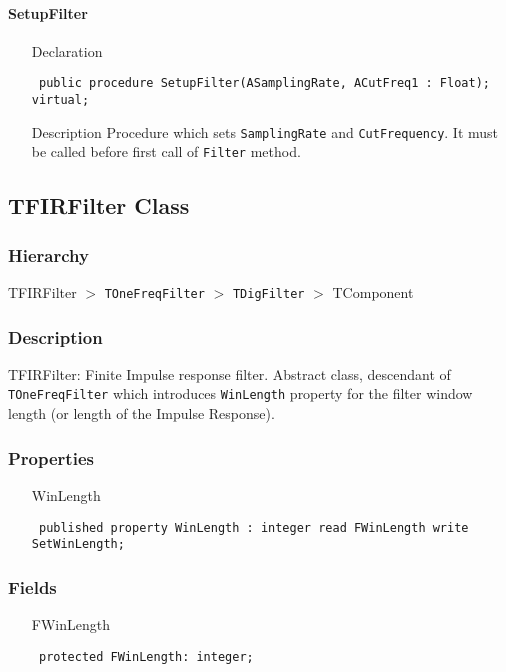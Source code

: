 \documentclass[12pt,a4paper,oneside]{report}
\newcommand{\declarationitem}[1]{{\addfontfeatures{FakeBold=1.3} #1}}
\newcommand{\descriptiontitle}[1]{{\addfontfeatures{FakeSlant}#1}}
\newcommand{\code}[1]{\texttt{#1}}
\begin{document}
\paragraph{SetupFilter}\hspace*{\fill}
\label{lmfilters.TOneFreqFilter-SetupFilter}
\begin{itemize}\item[\declarationitem{Declaration}\hfill]
	\begin{flushleft}
		\code{
			public procedure SetupFilter(ASamplingRate, ACutFreq1 : Float); virtual;}
	\end{flushleft}
	\item[\descriptiontitle{Description}] Procedure which sets \code{SamplingRate} and \code{CutFrequency}. It must be called before first call of \code{Filter} method.	
\end{itemize}
\subsection{TFIRFilter Class}
\label{lmfilters.TFIRFilter}
\subsubsection{Hierarchy}
TFIRFilter {$>$} \code{TOneFreqFilter} {$>$} \code{TDigFilter} {$>$} 
TComponent
\subsubsection{Description}
TFIRFilter: Finite Impulse response filter. Abstract class, descendant of \code{TOneFreqFilter} which introduces \code{WinLength} property for the filter window length (or length of the Impulse Response). 
\subsubsection{Properties}
\begin{itemize}\label{lmfilters.TFIRFilter-WinLength}
	\item[\declarationitem{WinLength}\hfill]
	\begin{flushleft}
		\code{
			published property WinLength : integer read FWinLength write SetWinLength;}
	\end{flushleft}
  \end{itemize}
\subsubsection{Fields}
\begin{itemize}\label{lmfilters.TFIRFilter-FWinLength}
	\item[\declarationitem{FWinLength}\hfill]
	\begin{flushleft}
		\code{
			protected FWinLength: integer;}
	\end{flushleft}
\end{itemize}
\end{document}
